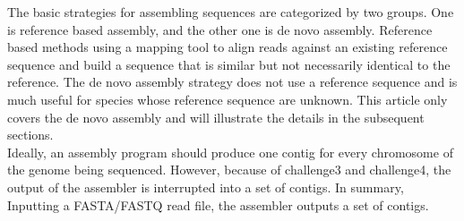 \documentclass{article}
\begin{document}
\noindent The basic strategies for assembling sequences are categorized by two groups. One is reference based assembly, and the other one is de novo assembly. Reference based methods using a mapping tool to align reads against an existing reference sequence and build a sequence that is similar but not necessarily identical to the reference. The de novo assembly strategy does not use a reference sequence and is much useful for species whose reference sequence are unknown. This article only covers the de novo assembly and will illustrate the details in the subsequent sections.\\
Ideally, an assembly program should produce one contig for every chromosome of the genome being sequenced. However, because of challenge3 and challenge4, the output of the assembler is interrupted into a set of contigs. In summary, Inputting a FASTA/FASTQ read file, the assembler outputs a set of contigs.
\renewcommand\refname{Reference}


\end{document}
